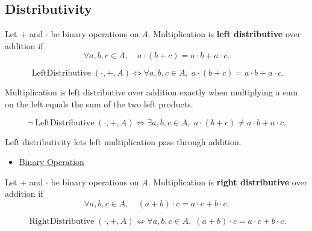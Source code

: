 \subsection*{Distributivity}
\label{subsec:distributivity}

\begin{definition}
\label{def:algebraic-left-distributivity}
Let $+$ and $\cdot$ be binary operations on $A$.
Multiplication is \textbf{left distributive} over addition if
\[
\forall a,b,c \in A,\quad
a\cdot(b+c)=a\cdot b+a\cdot c.
\]
\end{definition}

\begin{remark*}
\[
\operatorname{LeftDistributive}(\cdot,+,A)
\Longleftrightarrow
\forall a,b,c\in A,\; a\cdot(b+c)=a\cdot b+a\cdot c.
\]
\end{remark*}

\begin{remark*}
Multiplication is left distributive over addition exactly when multiplying a
sum on the left equals the sum of the two left products.
\end{remark*}

\begin{remark*}
\[
\neg\operatorname{LeftDistributive}(\cdot,+,A)
\Longleftrightarrow
\exists a,b,c\in A,\; a\cdot(b+c)\neq a\cdot b+a\cdot c.
\]
\end{remark*}

\begin{remark*}[Interpretation]
Left distributivity lets left multiplication pass through addition.
\end{remark*}

\begin{dependencies}
\begin{itemize}
  \item \hyperref[def:binary-operation]{Binary Operation}
\end{itemize}
\end{dependencies}

\begin{definition}
\label{def:algebraic-right-distributivity}
Let $+$ and $\cdot$ be binary operations on $A$.
Multiplication is \textbf{right distributive} over addition if
\[
\forall a,b,c \in A,\quad
(a+b)\cdot c=a\cdot c+b\cdot c.
\]
\end{definition}

\begin{remark*}
\[
\operatorname{RightDistributive}(\cdot,+,A)
\Longleftrightarrow
\forall a,b,c\in A,\; (a+b)\cdot c=a\cdot c+b\cdot c.
\]
\end{remark*}

